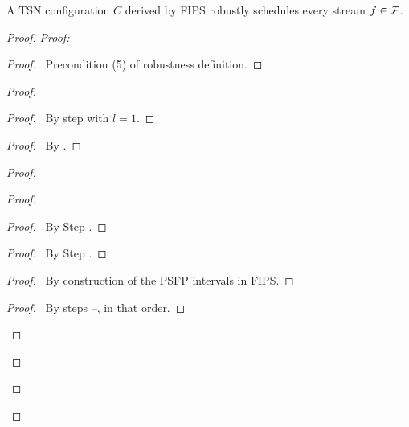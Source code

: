 \begin{theorem}\label{theorem:fips}
  A TSN configuration $C$ derived by FIPS robustly schedules every stream $f \in \mathcal{F}$.
\end{theorem}
\begin{proof}
    \textit{Proof:}
    \begin{proof}
      \pf\ Precondition (5) of robustness definition.
    \end{proof}
    \begin{proof}
      \begin{proof}
	\pf\ By step  with $l = 1$.
      \end{proof}
      \begin{proof}
	\pf\ By \IT.
      \end{proof}
      \qedstep
      \begin{proof}
	\begin{proof}
	  \begin{proof}
	    \pf\ By Step .
	  \end{proof}
	  \begin{proof}
	    \pf\ By Step .
	  \end{proof}
	  \begin{proof}
	    \pf\ By construction of the PSFP intervals in FIPS.
	  \end{proof}
	  \qedstep
	  \begin{proof}
	    \pf\ By steps --, in that order.
	  \end{proof}

\end{proof}
\end{proof}
\end{proof}
\end{proof}
